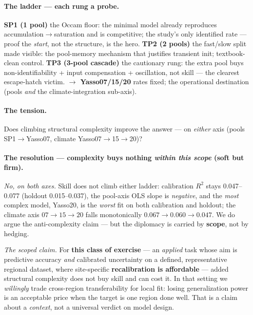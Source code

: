 \documentclass[10pt]{article}
\begin{document}
\paragraph{The ladder --- each rung a probe.}
\textbf{SP1 (1 pool)} the Occam floor: the minimal model already reproduces
accumulation$\to$saturation and is competitive; the study's only identified rate --- proof the
\emph{start}, not the structure, is the hero. \;
\textbf{TP2 (2 pools)} the fast/slow split made visible: the pool-memory mechanism that justifies
transient init; textbook-clean control. \;
\textbf{TP3 (3-pool cascade)} the cautionary rung: the extra pool buys non-identifiability + input
compensation + oscillation, not skill --- the clearest escape-hatch victim. \;
\textbf{$\to$ Yasso07/15/20} rates fixed; the operational destination (pools \emph{and} the
climate-integration sub-axis).

\paragraph{The tension.} Does climbing structural complexity improve the answer --- on \emph{either}
axis (pools SP1$\to$Yasso07, climate Yasso07$\to$15$\to$20)?

\paragraph{The resolution --- complexity buys nothing \emph{within this scope} (soft but firm).}
\emph{No, on both axes.} Skill does not climb either ladder: calibration $R^2$ stays 0.047--0.077
(holdout 0.015--0.037), the pool-axis OLS slope is \emph{negative}, and the \emph{most} complex model,
Yasso20, is the \emph{worst} fit on both calibration and holdout; the climate axis $07\!\to\!15\!\to\!20$
falls monotonically $0.067\!\to\!0.060\!\to\!0.047$. We do argue the anti-complexity claim --- but the
diplomacy is carried by \textbf{scope}, not by hedging.

\emph{The scoped claim.} For \textbf{this class of exercise} --- an \emph{applied} task whose aim is
predictive accuracy \emph{and} calibrated uncertainty on a defined, representative regional dataset,
where site-specific \textbf{recalibration is affordable} --- added structural complexity does not buy
skill and can cost it. In that setting we \emph{willingly} trade cross-region transferability for local
fit: losing generalization power is an acceptable price when the target is one region done well. That is
a claim about a \emph{context}, not a universal verdict on model design.
\end{document}
